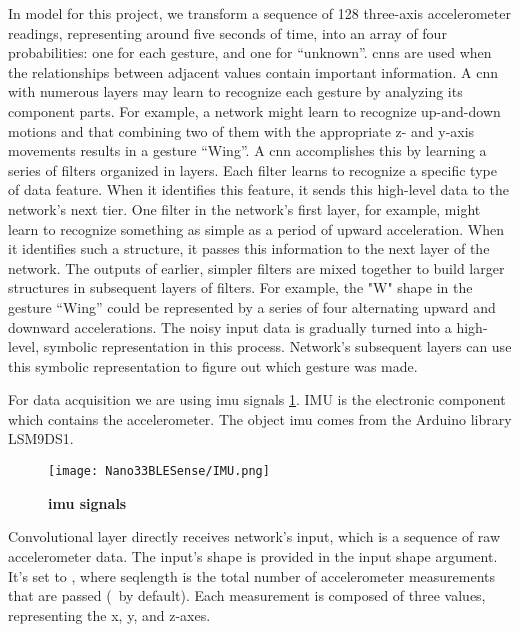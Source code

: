 In  model for this project,  we transform a sequence of 128 three-axis accelerometer readings, representing
around five seconds of time, into an array of four probabilities: one for each gesture,
and one for ``unknown''.  
\ac{cnn}s are used when the relationships between adjacent values contain important information\cite{Warden:2020}. 
A \ac{cnn} with numerous layers may learn to recognize each gesture by analyzing its component parts. For example, a network might learn to recognize up-and-down motions and that combining two of them with the appropriate z- and y-axis movements results in a gesture ``Wing''\cite{Warden:2020}.
A \ac{cnn} accomplishes this by learning a series of filters organized in layers. Each filter learns to recognize a specific type of data feature. When it identifies this feature, it sends this high-level data to the network's next tier. One filter in the network's first layer, for example, might learn to recognize something as simple as a period of upward acceleration. When it identifies such a structure, it passes this information to the next layer of the network.\cite{Warden:2020}
The outputs of earlier, simpler filters are mixed together to build larger structures in subsequent layers of filters. For example, the "W" shape in the gesture ``Wing'' could be represented by a series of four alternating upward and downward accelerations.
The noisy input data is gradually turned into a high-level, symbolic representation in this process. Network's subsequent layers can use this symbolic representation to figure out which gesture was made. \cite{Warden:2020}

For data acquisition we are using \ac{imu} signals \ref{fig:IMU}. IMU is the electronic component which contains the accelerometer. The object \ac{imu} comes from the Arduino  library LSM9DS1.

\begin{figure}[h!]
    \begin{center}
        \texttt{[image: Nano33BLESense/IMU.png]}
        \caption{\textbf{\ac{imu} signals \cite{Xu:2022} }}
        \label{fig:IMU}
    \end{center}
\end{figure}

Convolutional layer directly receives network's input, which is a sequence of raw accelerometer data. The input's shape is provided in the input shape argument. It's set to , where seqlength is the total number of accelerometer measurements that are passed (\ by default). Each measurement is composed of three values, representing the x, y, and z-axes. \cite{Warden:2020}

